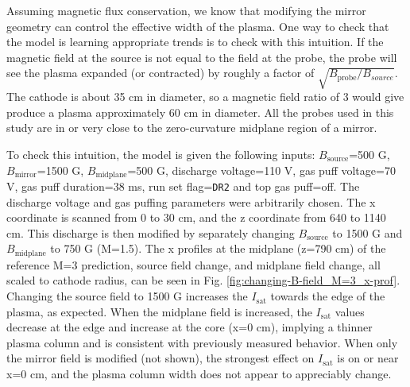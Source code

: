 Assuming magnetic flux conservation, we know that modifying the mirror geometry can control the effective width of the plasma. One way to check that the model is learning appropriate trends is to check with this intuition. If the magnetic field at the source is not equal to the field at the probe, the probe will see the plasma expanded (or contracted) by roughly a factor of $\sqrt{B_\text{probe}/B_{source}}$. The cathode is about 35 cm in diameter, so a magnetic field ratio of 3 would give produce a plasma approximately 60 cm in diameter. All the probes used in this study are in or very close to the zero-curvature midplane region of a mirror.

To check this intuition, the model is given the following inputs: $B_\text{source}$=500 G, $B_\text{mirror}$=1500 G, $B_\text{midplane}$=500 G, discharge voltage=110 V, gas puff voltage=70 V, gas puff duration=38 ms, run set flag=\texttt{DR2} and top gas puff=off. The discharge voltage and gas puffing parameters were arbitrarily chosen. The x coordinate is scanned from 0 to 30 cm, and the z coordinate from 640 to 1140 cm. This discharge is then modified by separately changing $B_\text{source}$ to 1500 G and $B_\text{midplane}$ to 750 G (M=1.5). %
The x profiles at the midplane (z=790 cm) of the reference M=3 prediction, source field change, and midplane field change, all scaled to cathode radius, can be seen in Fig. \ref{fig:changing-B-field_M=3_x-prof}. Changing the source field to 1500 G increases the $I_\text{sat}$ towards the edge of the plasma, as expected. When the midplane field is increased, the $I_\text{sat}$ values decrease at the edge and increase at the core (x=0 cm), implying a thinner plasma column and is consistent with previously measured behavior. When only the mirror field is modified (not shown), the strongest effect on $I_\text{sat}$ is on or near x=0 cm, and the plasma column width does not appear to appreciably change. 


